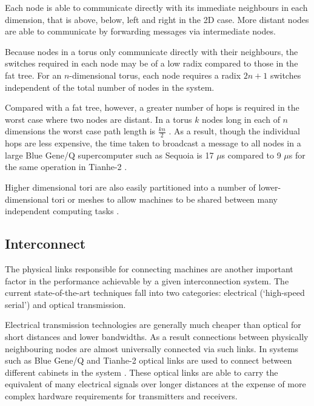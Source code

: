 				Each node is able to communicate directly with its immediate neighbours
				in each dimension, that is above, below, left and right in the 2D case.
				More distant nodes are able to communicate by forwarding messages via
				intermediate nodes.
				
				Because nodes in a torus only communicate directly with their
				neighbours, the switches required in each node may be of a low radix
				compared to those in the fat tree. For an $n$-dimensional torus, each
				node requires a radix $2n+1$ switches independent of the total number of
				nodes in the system.
				
				Compared with a fat tree, however, a greater number of hops is required
				in the worst case where two nodes are distant. In a torus $k$ nodes long
				in each of $n$ dimensions the worst case path length is $\frac{kn}{2}$
				\cite{dally04}. As a result, though the individual hops are less
				expensive, the time taken to broadcast a message to all nodes in a large
				Blue Gene/Q supercomputer such as Sequoia is 17 $\mu$s compared to 9
				$\mu$s for the same operation in Tianhe-2 \cite{morozov12}.
				
				Higher dimensional tori are also easily partitioned into a number of
				lower-dimensional tori or meshes to allow machines to be shared between
				many independent computing tasks \cite{yokokawa11,chen11}.
		
		\subsection{Interconnect}
			
			The physical links responsible for connecting machines are another
			important factor in the performance achievable by a given interconnection
			system. The current state-of-the-art techniques fall into two categories:
			electrical (`high-speed serial') and optical transmission.
			
			Electrical transmission technologies are generally much cheaper than
			optical for short distances and lower bandwidths. As a result connections
			between physically neighbouring nodes are almost universally connected via
			such links. In systems such as Blue Gene/Q and Tianhe-2 optical links are
			used to connect between different cabinets in the system
			\cite{dongarra13,prickett10}. These optical links are able to carry the
			equivalent of many electrical signals over longer distances at the expense
			of more complex hardware requirements for transmitters and receivers.
			
